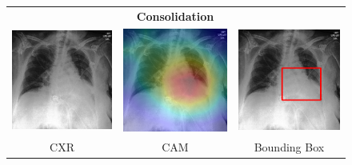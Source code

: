\begin{figure}[htbp!]
\centering
\begin{tabular}{ccc}
 &\textbf{Consolidation}& \\
\vspace{2mm}
  \includegraphics[width=35mm]{Tesi/images/CAMs/CAM8/image.png} &   
  \includegraphics[width=35mm]{Tesi/images/CAMs/CAM8/image_cam.png} &   
  \includegraphics[width=35mm]{Tesi/images/CAMs/CAM8/image_bbox.png} \\
\footnotesize{CXR} & \footnotesize{CAM} & \footnotesize{Bounding Box} \\[6pt]
\end{tabular}
\caption[Consolidation CAM-1]{}
\label{fig:figure_5.22}
\end{figure}

\newpage

